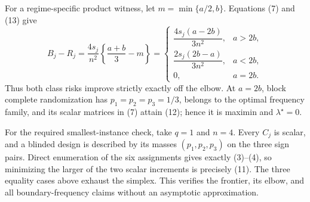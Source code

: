 For a regime-specific product witness, let \(m=\min\{a/2,b\}\). Equations (7) and (13) give
\[
B_j-R_j
=\frac{4s_j}{n^2}\left\{\frac{a+b}{3}-m\right\}
=
\begin{cases}
\dfrac{4s_j(a-2b)}{3n^2},&a>2b,\\[6pt]
\dfrac{2s_j(2b-a)}{3n^2},&a<2b,\\[6pt]
0,&a=2b.
\end{cases} \tag{14}
\]
Thus both class risks improve strictly exactly off the elbow. At \(a=2b\), block complete randomization has \(p_1=p_2=p_3=1/3\), belongs to the optimal frequency family, and its scalar matrices in (7) attain (12); hence it is maximin and \(\lambda^\star=0\).

For the required smallest-instance check, take \(q=1\) and \(n=4\). Every \(C_j\) is scalar, and a blinded design is described by its masses \((p_1,p_2,p_3)\) on the three sign pairs. Direct enumeration of the six assignments gives exactly (3)--(4), so minimizing the larger of the two scalar increments is precisely (11). The three equality cases above exhaust the simplex. This verifies the frontier, its elbow, and all boundary-frequency claims without an asymptotic approximation.